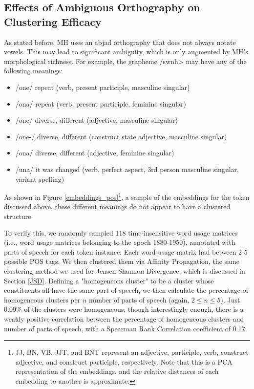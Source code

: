 \documentclass[10pt, a4paper]{article}
\begin{document}
\subsection{Effects of Ambiguous Orthography on Clustering Efficacy}
As stated before, MH uses an abjad orthography that does not always notate vowels. This may lead to significant ambiguity, which is only augmented by MH's morphological richness. For example, the grapheme \</swnh> may have any of the following meanings:
\begin{itemize}
    \item /\textesh one/ repeat (verb, present participle, masculine singular)
    \item /\textesh ona/ repeat (verb, present participle, feminine singular)
    \item /\textesh one/ diverse, different (adjective, masculine singular)
    \item /\textesh one-/ diverse, different (construct state adjective, masculine singular)
    \item /\textesh ona/ diverse, different (adjective, feminine singular)
    \item /\textesh una/ it was changed (verb, perfect aspect, 3rd person masculine singular, variant spelling)
\end{itemize}

As shown in Figure \ref{embeddings_pos}\footnote{JJ, BN, VB, JJT, and BNT represent an adjective, participle, verb, construct adjective, and construct participle, respectively. Note that this is a PCA representation of the embeddings, and the relative distances of each embedding to another is approximate.}, a sample of the embeddings for the token discussed above, these different meanings do not appear to have a clustered structure. 

To verify this, we randomly sampled 118 time-insensitive word usage matrices (i.e., word usage matrices belonging to the epoch 1880-1950), annotated with parts of speech for each token instance. Each word usage matrix had between 2-5 possible POS tags. We then clustered them via Affinity Propagation, the same clustering method we used for Jensen Shannon Divergence, which is discussed in Section \ref{JSD}. Defining a "homogeneous cluster" to be a cluster whose constituents all have the same part of speech, we then calculate the percentage of homogeneous clusters per $n$ number of parts of speech (again, $2 \leq n \leq 5$). Just 0.09\% of the clusters were homogeneous, though interestingly enough, there is a weakly positive correlation between the percentage of homogeneous clusters and number of parts of speech, with a Spearman Rank Correlation coefficient of 0.17.
\end{document}
